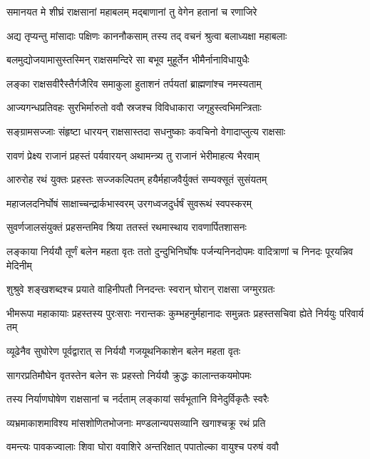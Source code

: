 \twolineshloka
{समानयत मे शीघ्रं राक्षसानां महाबलम्}
{मद्बाणानां तु वेगेन हतानां च रणाजिरे} %

\twolineshloka
{अद्य तृप्यन्तु मांसादाः पक्षिणः काननौकसाम्}
{तस्य तद् वचनं श्रुत्वा बलाध्यक्षा महाबलाः} %

\twolineshloka
{बलमुद्योजयामासुस्तस्मिन् राक्षसमन्दिरे}
{सा बभूव मुहूर्तेन भीमैर्नानाविधायुधैः} %

\twolineshloka
{लङ्का राक्षसवीरैस्तैर्गजैरिव समाकुला}
{हुताशनं तर्पयतां ब्राह्मणांश्च नमस्यताम्} %

\twolineshloka
{आज्यगन्धप्रतिवहः सुरभिर्मारुतो ववौ}
{स्रजश्च विविधाकारा जगृहुस्त्वभिमन्त्रिताः} %

\twolineshloka
{सङ्ग्रामसज्जाः संहृष्टा धारयन् राक्षसास्तदा}
{सधनुष्काः कवचिनो वेगादाप्लुत्य राक्षसाः} %

\twolineshloka
{रावणं प्रेक्ष्य राजानं प्रहस्तं पर्यवारयन्}
{अथामन्त्र्य तु राजानं भेरीमाहत्य भैरवाम्} %

\twolineshloka
{आरुरोह रथं युक्तः प्रहस्तः सज्जकल्पितम्}
{हयैर्महाजवैर्युक्तं सम्यक्सूतं सुसंयतम्} %

\twolineshloka
{महाजलदनिर्घोषं साक्षाच्चन्द्रार्कभास्वरम्}
{उरगध्वजदुर्धर्षं सुवरूथं स्वपस्करम्} %

\twolineshloka
{सुवर्णजालसंयुक्तं प्रहसन्तमिव श्रिया}
{ततस्तं रथमास्थाय रावणार्पितशासनः} %

\threelineshloka
{लङ्काया निर्ययौ तूर्णं बलेन महता वृतः}
{ततो दुन्दुभिनिर्घोषः पर्जन्यनिनदोपमः}
{वादित्राणां च निनदः पूरयन्निव मेदिनीम्} %

\twolineshloka
{शुश्रुवे शङ्खशब्दश्च प्रयाते वाहिनीपतौ}
{निनदन्तः स्वरान् घोरान् राक्षसा जग्मुरग्रतः} %

\threelineshloka
{भीमरूपा महाकायाः प्रहस्तस्य पुरःसराः}
{नरान्तकः कुम्भहनुर्महानादः समुन्नतः}
{प्रहस्तसचिवा ह्येते निर्ययुः परिवार्य तम्} %

\twolineshloka
{व्यूढेनैव सुघोरेण पूर्वद्वारात् स निर्ययौ}
{गजयूथनिकाशेन बलेन महता वृतः} %

\twolineshloka
{सागरप्रतिमौघेन वृतस्तेन बलेन सः}
{प्रहस्तो निर्ययौ क्रुद्धः कालान्तकयमोपमः} %

\twolineshloka
{तस्य निर्याणघोषेण राक्षसानां च नर्दताम्}
{लङ्कायां सर्वभूतानि विनेदुर्विकृतैः स्वरैः} %

\twolineshloka
{व्यभ्रमाकाशमाविश्य मांसशोणितभोजनाः}
{मण्डलान्यपसव्यानि खगाश्चक्रू रथं प्रति} %

\twolineshloka
{वमन्त्यः पावकज्वालाः शिवा घोरा ववाशिरे}
{अन्तरिक्षात् पपातोल्का वायुश्च परुषं ववौ} %

